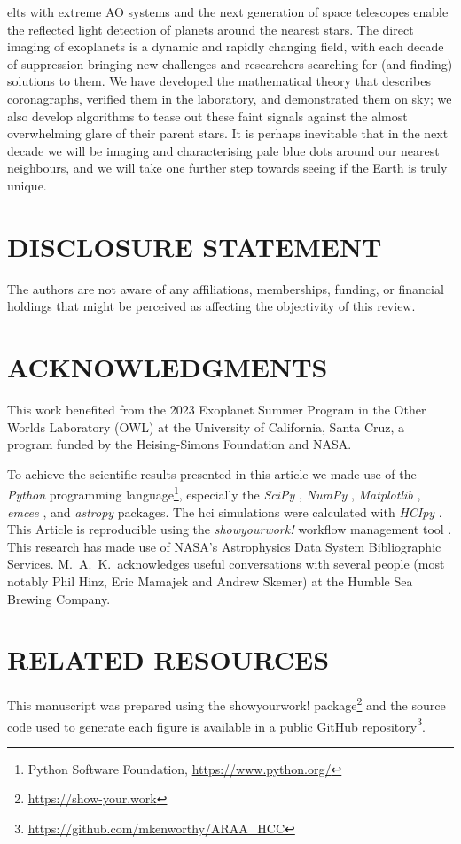 \documentclass[letterpaper]{ar-1col}
\newcommand{\project}[1]{\textsf{#1}}
\begin{document}
\acp{elt} with extreme AO systems and the next generation of space telescopes enable the reflected light detection of planets around the nearest stars.
%
The direct imaging of exoplanets is a dynamic and rapidly changing field, with each decade of suppression bringing new challenges and researchers searching for (and finding) solutions to them.
%
We have developed the mathematical theory that describes coronagraphs, verified them in the laboratory, and demonstrated them on sky; we also develop algorithms to tease out these faint signals against the almost overwhelming glare of their parent stars.
%
It is perhaps inevitable that in the next decade we will be imaging and characterising pale blue dots around our nearest neighbours, and we will take one further step towards seeing if the Earth is truly unique.

\section*{DISCLOSURE STATEMENT}
The authors are not aware of any affiliations, memberships, funding, or financial holdings that might be perceived as affecting the objectivity of this review.

\section*{ACKNOWLEDGMENTS}
This work benefited from the 2023 Exoplanet Summer Program in the Other Worlds Laboratory (OWL) at the University of California, Santa Cruz, a program funded by the Heising-Simons Foundation and NASA.

To achieve the scientific results presented in this article we made use of the \emph{Python} programming language\footnote{Python Software Foundation, \url{https://www.python.org/}}, especially the \emph{SciPy} \citep{virtanen2020}, \emph{NumPy} \citep{numpy}, \emph{Matplotlib} \citep{Matplotlib}, \emph{emcee} \citep{foreman-mackey2013}, and \emph{astropy} \citep{astropy_1,astropy_2} packages.
%
The \ac{hci} simulations were calculated with \emph{HCIpy} \citep{Por18}.
%
This Article is reproducible using the \emph{showyourwork!} workflow management tool \citep{Luger2021}.
%
This research has made use of NASA's Astrophysics Data System Bibliographic Services.
%
M.\ A.\ K.\ acknowledges useful conversations with several people (most notably
Phil Hinz, Eric Mamajek and Andrew Skemer) at the Humble Sea Brewing Company.





\section*{RELATED RESOURCES}

This manuscript was prepared using the \project{showyourwork!} package\footnote{\url{https://show-your.work}} and the source code used to generate each figure is available in a public \project{GitHub} repository\footnote{\url{https://github.com/mkenworthy/ARAA_HCC}}.
\end{document}
